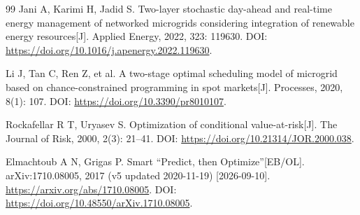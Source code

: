 \begin{thebibliography}{99}
Jani A, Karimi H, Jadid S.
Two-layer stochastic day-ahead and real-time energy management of networked microgrids considering integration of renewable energy resources[J].
Applied Energy, 2022, 323: 119630.
DOI: \url{https://doi.org/10.1016/j.apenergy.2022.119630}.

Li J, Tan C, Ren Z, et al.
A two-stage optimal scheduling model of microgrid based on chance-constrained programming in spot markets[J].
Processes, 2020, 8(1): 107.
DOI: \url{https://doi.org/10.3390/pr8010107}.

Rockafellar R T, Uryasev S.
Optimization of conditional value-at-risk[J].
The Journal of Risk, 2000, 2(3): 21--41.
DOI: \url{https://doi.org/10.21314/JOR.2000.038}.

Elmachtoub A N, Grigas P.
Smart ``Predict, then Optimize''[EB/OL].
arXiv:1710.08005, 2017 (v5 updated 2020-11-19) [2026-09-10].
\url{https://arxiv.org/abs/1710.08005}.
DOI: \url{https://doi.org/10.48550/arXiv.1710.08005}.

\end{thebibliography}
\endgroup
